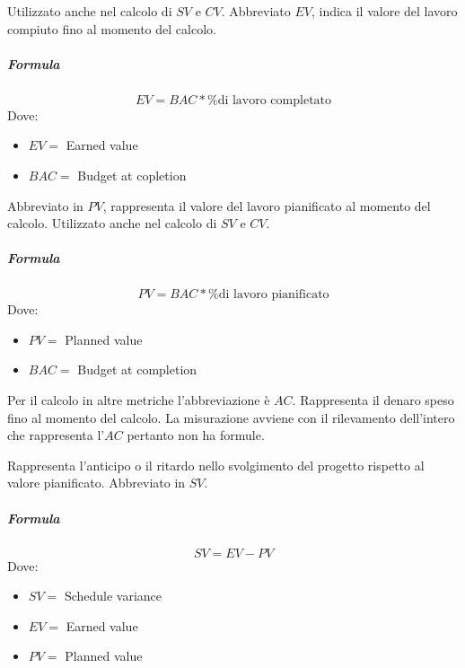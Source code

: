         Utilizzato anche nel calcolo di $SV$ e $CV$. Abbreviato $EV$, indica il valore del lavoro compiuto fino al momento del calcolo.
        \subparagraph{Formula}
        \begin{displaymath}
          EV = BAC * \% \textrm{di lavoro completato}
        \end{displaymath}
        Dove:
        \begin{itemize}
            \item[] $EV =$ Earned value
            \item[] $BAC =$ Budget at copletion
        \end{itemize}
        
        Abbreviato in $PV$, rappresenta il valore del lavoro pianificato al momento del calcolo. Utilizzato anche nel calcolo di $SV$ e $CV$.
        \subparagraph{Formula}
        \begin{displaymath}
          PV = BAC * \% \textrm{di lavoro pianificato}
        \end{displaymath}
        Dove:
        \begin{itemize}
            \item[] $PV =$ Planned value
            \item[] $BAC =$ Budget at completion
        \end{itemize}
        
        Per il calcolo in altre metriche l'abbreviazione è $AC$.
        Rappresenta il denaro speso fino al momento del calcolo.
         La misurazione avviene con il rilevamento dell'intero che rappresenta l'$AC$ pertanto non ha formule.
        
        Rappresenta l'anticipo o il ritardo nello svolgimento del progetto rispetto al valore pianificato. Abbreviato in $SV$.
        \subparagraph{Formula}
        \begin{displaymath}
          SV = EV - PV
        \end{displaymath}
        Dove:
        \begin{itemize}
            \item[] $SV =$ Schedule variance
            \item[] $EV =$ Earned value
            \item[] $PV =$ Planned value
        \end{itemize}
        
